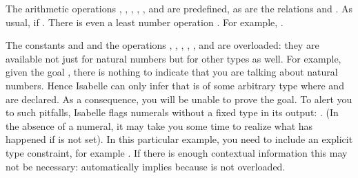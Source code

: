 \begin{isabellebody}
\begin{isamarkuptext}
{}
%
The arithmetic operations ,
, ,
, ,  and
 are predefined, as are the relations
 and
. As usual,  if
. There is even a least number operation
\@.  For example, .
\begin{warn}
  The constants  and  and the operations
  , ,
  , ,
  ,  and
   are overloaded: they are available
  not just for natural numbers but for other types as well.
  For example, given the goal , there is nothing to indicate
  that you are talking about natural numbers. Hence Isabelle can only infer
  that  is of some arbitrary type where  and  are
  declared. As a consequence, you will be unable to prove the
  goal. To alert you to such pitfalls, Isabelle flags numerals without a
  fixed type in its output: . (In the absence of a numeral,
  it may take you some time to realize what has happened if  is not set).  In this particular example, you need to include
  an explicit type constraint, for example . If there
  is enough contextual information this may not be necessary:  automatically implies  because  is not
  overloaded.


\end{warn}
\end{isamarkuptext}
\end{isabellebody}
